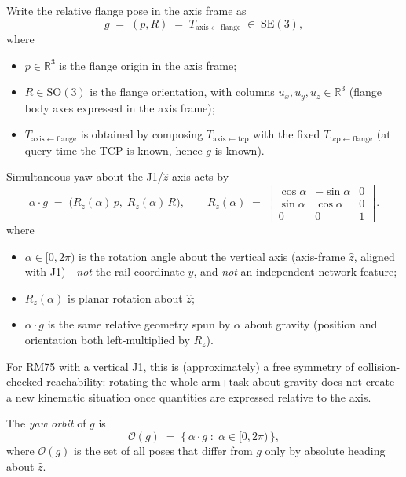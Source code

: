 \documentclass[11pt,a4paper]{article}
\newcommand{\SE}{\mathrm{SE}}
\newcommand{\SO}{\mathrm{SO}}
\newcommand{\R}{\mathbb{R}}
\begin{document}
Write the relative flange pose in the axis frame as
\begin{equation}
\label{eq:g-def}
  g
  \;=\;
  (p,R)
  \;=\;
  T_{\mathrm{axis\leftarrow flange}}
  \;\in\;
  \SE(3),
\end{equation}
where
\begin{itemize}[leftmargin=1.4em]
  \item \(p\in\R^{3}\) is the flange origin in the axis frame;
  \item \(R\in\SO(3)\) is the flange orientation, with columns
        \(u_{x},u_{y},u_{z}\in\R^{3}\) (flange body axes expressed in the
        axis frame);
  \item \(T_{\mathrm{axis\leftarrow flange}}\) is obtained by composing
        \(T_{\mathrm{axis\leftarrow tcp}}\) with the fixed
        \(T_{\mathrm{tcp\leftarrow flange}}\) (at query time the TCP is
        known, hence \(g\) is known).
\end{itemize}

Simultaneous yaw about the J1/\(\hat z\) axis acts by
\begin{equation}
\label{eq:yaw-action}
  \alpha\cdot g
  \;=\;
  \bigl(R_{z}(\alpha)\,p,\; R_{z}(\alpha)\,R\bigr),
  \qquad
  R_{z}(\alpha)
  \;=\;
  \begin{bmatrix}
    \cos\alpha & -\sin\alpha & 0 \\
    \sin\alpha & \cos\alpha & 0 \\
    0 & 0 & 1
  \end{bmatrix}.
\end{equation}
where
\begin{itemize}[leftmargin=1.4em]
  \item \(\alpha\in[0,2\pi)\) is the rotation angle about the vertical axis
        (axis-frame \(\hat z\), aligned with J1)---\emph{not} the rail
        coordinate \(y\), and \emph{not} an independent network feature;
  \item \(R_{z}(\alpha)\) is planar rotation about \(\hat z\);
  \item \(\alpha\cdot g\) is the same relative geometry spun by \(\alpha\)
        about gravity (position and orientation both left-multiplied by
        \(R_{z}\)).
\end{itemize}
For RM75 with a vertical J1, this is (approximately) a free symmetry of
collision-checked reachability: rotating the whole arm+task about gravity
does not create a new kinematic situation once quantities are expressed
relative to the axis.

The \emph{yaw orbit} of \(g\) is
\begin{equation}
\label{eq:yaw-orbit}
  \mathcal{O}(g)
  \;=\;
  \{\,\alpha\cdot g \;:\; \alpha\in[0,2\pi)\,\},
\end{equation}
where \(\mathcal{O}(g)\) is the set of all poses that differ from \(g\) only
by absolute heading about \(\hat z\).
\end{document}
